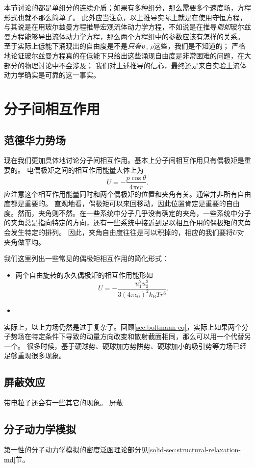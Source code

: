 本节讨论的都是单组分的连续介质；如果有多种组分，那么需要多个速度场，方程形式也就不那么简单了。
此外应当注意，以上推导实际上就是在使用守恒方程，与其说是在用玻尔兹曼方程推导宏观流体动力学方程，不如说是在推导\emph{假如}玻尔兹曼方程能够导出流体动力学方程，那么两个方程组中的参数应该有怎样的关系。
至于实际上低能下涌现出的自由度是不是\emph{只有}$\vb*{v}$, $\rho$这些，我们是不知道的；
严格地论证玻尔兹曼方程真的在低能下只给出这些涌现自由度是非常困难的问题，在大部分的物理讨论中不会涉及；
我们对上述推导的信心，最终还是来自实验上流体动力学确实是可靠的这一事实。

\section{分子间相互作用}\label{sec:molecular-interaction}

\subsection{范德华力势场}

现在我们更加具体地讨论分子间相互作用。基本上分子间相互作用只有偶极矩是重要的。
电偶极矩之间的相互作用能量大体上为
\begin{equation}
    U = - \frac{p \cos \theta}{4 \pi \epsilon r}.
\end{equation}
应注意这个相互作用能量同时和两个偶极矩的位置和夹角有关。通常并非所有自由度都是重要的。
直观地看，偶极矩可以来回移动，因此位置肯定是重要的自由度。然而，夹角则不然。在一些系统中分子几乎没有确定的夹角，一些系统中分子的夹角总是指向特定的方向，还有一些系统中接近到足以相互作用的偶极矩的夹角会发生特定的排列。
因此，夹角自由度往往是可以积掉的，相应的我们要将$U$对夹角做平均。

我们这里列出一些常见的偶极矩相互作用的简化形式：
\begin{itemize}
    \item 两个自由旋转的永久偶极矩的相互作用能形如
    \begin{equation}
        U = - \frac{u_1^2 u_2^2}{3 (4\pi\epsilon_0)^2 k_\text{B}T r^6}.
    \end{equation}
    \item 
\end{itemize}

实际上，以上力场仍然是过于复杂了。回顾\autoref{sec:boltmann-eq}，实际上如果两个分子势场在特定条件下导致的动量方向改变和散射截面相同，那么可以用一个代替另一个。
很多时候，基于硬球势、硬球加方势阱势、硬球加小的吸引势等力场已经足够重现很多现象。

\subsection{屏蔽效应}

带电粒子还会有一些其它的现象。 屏蔽

\subsection{分子动力学模拟}

第一性的分子动力学模拟的密度泛函理论部分见\ref{solid-sec:structural-relaxation-md}节。